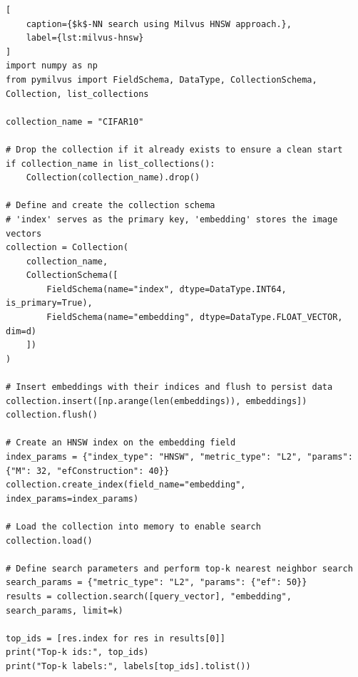 \begin{lstlisting}[
    caption={$k$-NN search using Milvus HNSW approach.},
    label={lst:milvus-hnsw}
]
import numpy as np
from pymilvus import FieldSchema, DataType, CollectionSchema, Collection, list_collections

collection_name = "CIFAR10"

# Drop the collection if it already exists to ensure a clean start
if collection_name in list_collections():
    Collection(collection_name).drop()

# Define and create the collection schema
# 'index' serves as the primary key, 'embedding' stores the image vectors
collection = Collection(
    collection_name,
    CollectionSchema([
        FieldSchema(name="index", dtype=DataType.INT64, is_primary=True),
        FieldSchema(name="embedding", dtype=DataType.FLOAT_VECTOR, dim=d)
    ])
)

# Insert embeddings with their indices and flush to persist data
collection.insert([np.arange(len(embeddings)), embeddings])
collection.flush()

# Create an HNSW index on the embedding field
index_params = {"index_type": "HNSW", "metric_type": "L2", "params": {"M": 32, "efConstruction": 40}}
collection.create_index(field_name="embedding", index_params=index_params)

# Load the collection into memory to enable search
collection.load()

# Define search parameters and perform top-k nearest neighbor search
search_params = {"metric_type": "L2", "params": {"ef": 50}}
results = collection.search([query_vector], "embedding", search_params, limit=k)

top_ids = [res.index for res in results[0]]
print("Top-k ids:", top_ids)
print("Top-k labels:", labels[top_ids].tolist())
\end{lstlisting}